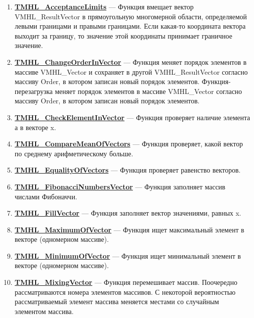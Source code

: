 \documentclass[a4paper,12pt]{article}
\begin{document}
\begin{enumerate}
\item \textbf{\hyperref[TMHL_AcceptanceLimits]{TMHL\_AcceptanceLimits}} --- Функция вмещает вектор VMHL\_ResultVector в прямоугольную многомерной области, определяемой левыми границами и правыми границами. Если какая-то координата вектора выходит за границу, то значение этой координаты принимает граничное значение.

\item \textbf{\hyperref[TMHL_ChangeOrderInVector]{TMHL\_ChangeOrderInVector}} --- Функция меняет порядок элементов в массиве VMHL\_Vector и сохраняет в другой VMHL\_ResultVector согласно массиву Order, в котором записан новый порядок элементов. Функция-перезагрузка меняет порядок элементов в массиве VMHL\_Vector согласно массиву Order, в котором записан новый порядок элементов.

\item \textbf{\hyperref[TMHL_CheckElementInVector]{TMHL\_CheckElementInVector}} --- Функция проверяет наличие элемента а в векторе x.

\item \textbf{\hyperref[TMHL_CompareMeanOfVectors]{TMHL\_CompareMeanOfVectors}} --- Функция проверяет, какой вектор по среднему арифметическому больше.

\item \textbf{\hyperref[TMHL_EqualityOfVectors]{TMHL\_EqualityOfVectors}} --- Функция проверяет равенство векторов.

\item \textbf{\hyperref[TMHL_FibonacciNumbersVector]{TMHL\_FibonacciNumbersVector}} --- Функция заполняет массив числами Фибоначчи.

\item \textbf{\hyperref[TMHL_FillVector]{TMHL\_FillVector}} --- Функция заполняет вектор значениями, равных x.

\item \textbf{\hyperref[TMHL_MaximumOfVector]{TMHL\_MaximumOfVector}} --- Функция ищет максимальный элемент в векторе (одномерном массиве).

\item \textbf{\hyperref[TMHL_MinimumOfVector]{TMHL\_MinimumOfVector}} --- Функция ищет минимальный элемент в векторе (одномерном массиве).

\item \textbf{\hyperref[TMHL_MixingVector]{TMHL\_MixingVector}} --- Функция перемешивает массив. Поочередно рассматриваются номера элементов массивов. С некоторой вероятностью рассматриваемый элемент массива меняется местами со случайным элементом массива.


\end{enumerate}
\end{document}
